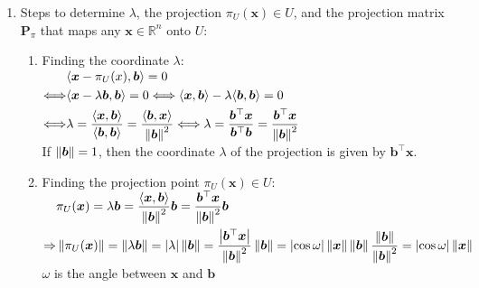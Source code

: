 \begin{enumerate}
    \item Steps to determine $\lambda$, the projection $\pi _U (\bm{x}) \in  U$, and the projection matrix $\bm{P}_ \pi $ that maps any $\bm{x} \in  \mathbb{R}^n$ onto $U$:
    \hfill \cite{mfml/book/mml/Deisenroth-Faisal-Ong}
    \begin{enumerate}
        \item Finding the coordinate $\lambda $:
        \hfill \cite{mfml/book/mml/Deisenroth-Faisal-Ong}
        \\
        $
            \begin{aligned}
                & \langle\bm{x} - \pi_ U (x), \bm{b}\rangle = 0 
                \\
                \Longleftrightarrow &
                    \langle\bm{x} - \lambda \bm{b}, \bm{b}\rangle = 0
                    \Longleftrightarrow 
                    \langle\bm{x}, \bm{b}\rangle - \lambda  \langle\bm{b}, \bm{b}\rangle = 0 
                \\
                \Longleftrightarrow &
                    \lambda  
                    = \dfrac{\langle\bm{x}, \bm{b}\rangle}{\langle\bm{b}, \bm{b}\rangle} 
                    = \dfrac{\langle\bm{b}, \bm{x}\rangle}{\left\| \bm{b} \right\|^2}
                    \Longleftrightarrow 
                    \lambda 
                    =\dfrac{\bm{b}^\top \bm{x}}{\bm{b}^\top \bm{b}}
                    =\dfrac{\bm{b}^\top \bm{x}}{\left\| \bm{b} \right\|^2}
            \end{aligned}
        $
        \hfill \cite{mfml/book/mml/Deisenroth-Faisal-Ong}
        \\
        If $\left\| \bm{b} \right\| = 1$, then the coordinate $\lambda$ of the projection is given by $\bm{b}^\top \bm{x}$.
        \hfill \cite{mfml/book/mml/Deisenroth-Faisal-Ong}

        \item Finding the projection point $\pi_U (\bm{x}) \in U$:
        \hfill \cite{mfml/book/mml/Deisenroth-Faisal-Ong}
        \\
        $
            \begin{aligned}
                & \pi _U (\bm{x}) = \lambda  \bm{b} 
                    = \dfrac{\langle\bm{x}, \bm{b}\rangle}{\left\| \bm{b} \right\|^2} \bm{b} 
                    = \dfrac{\bm{b}^\top \bm{x}}{\left\| \bm{b} \right\|^2} \bm{b} 
                \\
                \Rightarrow &
                    \left\| \pi _U (\bm{x}) \right\| = \left\| \lambda  \bm{b} \right\| = \left| \lambda \right| \left\| \bm{b} \right\| 
                    = \dfrac{\left| \bm{b}^\top \bm{x} \right|}{\left\| \bm{b} \right\|^2} \left\| \bm{b} \right\|
                    = \left| \cos \omega \right| \left\| \bm{x} \right\| \left\| \bm{b} \right\| \dfrac{\left\| \bm{b} \right\|}{\left\| \bm{b} \right\|^2}
                    = \left| \cos \omega \right| \left\| \bm{x} \right\| 
            \end{aligned}
        $
        \\
        $\omega$ is the angle between $\bm{x}$ and $\bm{b}$
        \hfill \cite{mfml/book/mml/Deisenroth-Faisal-Ong}


\end{enumerate}
\end{enumerate}
